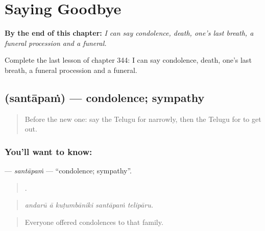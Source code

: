 
\chapter{Saying Goodbye}
\label{ch:te-saying-goodbye}

\begin{chapteropening}
\textbf{By the end of this chapter:} \emph{I can say condolence, death, one's last breath, a funeral procession and a funeral.}

Complete the last lesson of chapter 344: I can say condolence, death, one's last breath, a funeral procession and a funeral.
\end{chapteropening}

\section[\texorpdfstring{\te{సంతాపం} (santāpaṁ)}{సంతాపం (santāpaṁ)}]{ (santāpaṁ) — condolence; sympathy}

\label{lesson:TE-C344-santapam}



\begin{quote}
Before the new one: say the Telugu for narrowly, then the Telugu for to get out.
\end{quote}

\subsection*{You'll want to know: }
\textbf{} — \emph{santāpaṁ} — \textquotedblleft{}condolence; sympathy\textquotedblright{}.

\begin{quote}
    .
\end{quote}

\begin{quote}
\emph{andarū ā kuṭumbāniki santāpaṁ telipāru.}
\end{quote}

\begin{quote}
Everyone offered condolences to that family.
\end{quote}

